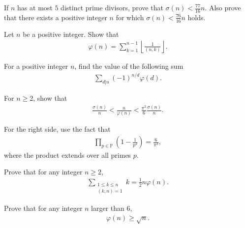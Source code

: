 \documentclass[12pt]{subfile}
\begin{document}
	\begin{problem}
		If $n$ has at most $5$ distinct prime divisors, prove that $\sigma(n) < \frac{77}{16} n.$ Also prove that there exists a positive integer $n$ for which $\sigma(n) < \frac{76}{16} n$ holds.
	\end{problem}
	
	\begin{problem}
		Let $n$ be a positive integer. Show that
			\begin{align*}
				\varphi(n)=\sum_{k=1}^{n-1} \left\lfloor\frac{1}{(n,k)} \right\rfloor.
			\end{align*}
	\end{problem}
	
	
	\begin{problem}
		For a positive integer $n$, find the value of the following sum
			\begin{align*}
				\sum\limits_{d|n} (-1)^{n/d} \varphi(d).
			\end{align*}
	\end{problem}

	\begin{problem}
		For $n \geq 2$, show that
			\begin{align*}
				\frac{\sigma(n)}{n} < \frac{n}{\varphi(n)} < \frac{\pi^{2}}{6} \frac{\sigma(n)}{n}.
			\end{align*}
	\end{problem}
	
	\begin{hint}
		For the right side, use the fact that 
			\begin{align*}
				\prod_{p \in \mathbb P} \left(1 - \frac{1}{p^2}\right) = \frac{6}{\pi^2},
			\end{align*}
		where the product extends over all primes $p$.
	\end{hint}
	\begin{problem}
		Prove that for any integer $n\geq 2$,	
			\begin{align*}
				 \sum_{\substack{1 \leq k \leq n \\ (k,n)=1}} k = \frac{1}{2}n\varphi(n).
			\end{align*}
	\end{problem}
	
	\begin{problem}
		Prove that for any integer $n$ larger than $6$,
			\begin{align*}
				\varphi(n) \geq \sqrt n.
			\end{align*}
	\end{problem}
	
\end{document}
